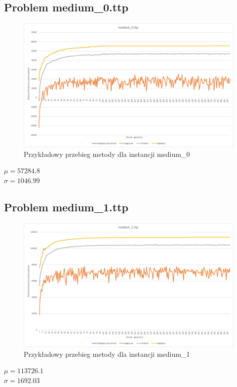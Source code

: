 \documentclass{article}
\begin{document}
	\subsection{Problem medium\_0.ttp}
	\begin{figure}[H]
		\centering
		\includegraphics[width=1\linewidth]{medium0.png}
		\caption{Przykładowy przebieg metody dla instancji medium\_0}
		\label{fig:medium0}
	\end{figure}
	\begin{center}
		$\mu = 57284.8$
		\\$\sigma = 1046.99$
	\end{center}


	\subsection{Problem medium\_1.ttp}
	\begin{figure}[H]
		\centering
		\includegraphics[width=1\linewidth]{medium1.png}
		\caption{Przykładowy przebieg metody dla instancji medium\_1}
		\label{fig:medium1}
	\end{figure}
	\begin{center}
		$\mu = 113726.1$
		\\$\sigma = 1692.03$
	\end{center}
\end{document}
